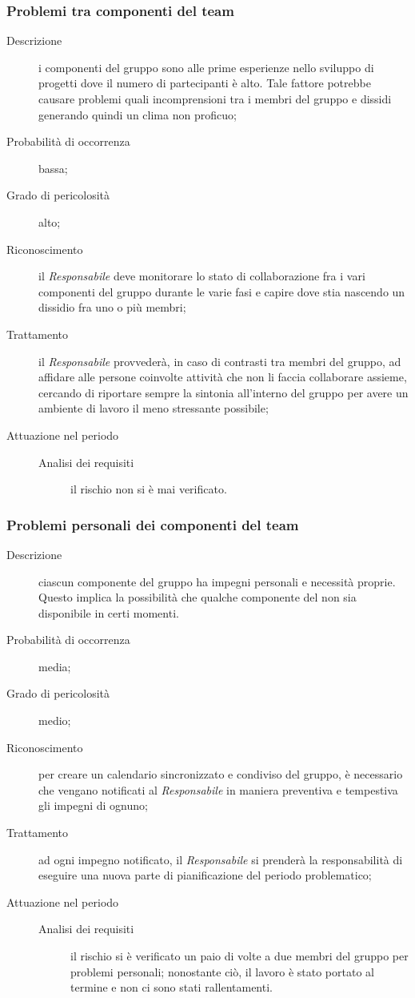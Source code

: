 		\subsubsection{Problemi tra componenti del team}
		\begin{description}
			\item[Descrizione] i componenti del gruppo sono alle prime esperienze nello sviluppo di progetti dove il numero di partecipanti è alto. Tale fattore potrebbe causare problemi quali incomprensioni tra i membri del gruppo e dissidi generando quindi un clima non proficuo;
			\item[Probabilità di occorrenza] bassa;
			\item[Grado di pericolosità] alto;
			\item[Riconoscimento] il \emph{Responsabile} deve monitorare lo stato di collaborazione fra i vari componenti del gruppo durante le varie fasi e capire dove stia nascendo un dissidio fra uno o più membri;
			\item[Trattamento] il \emph{Responsabile} provvederà, in caso di contrasti tra membri del gruppo, ad affidare alle persone coinvolte attività che non li faccia collaborare assieme, cercando di riportare sempre la sintonia all'interno del gruppo per avere un ambiente di lavoro il meno stressante possibile;
			\item[Attuazione nel periodo]
			\begin{description}
				\item[Analisi dei requisiti] il rischio non si è mai verificato.
			\end{description}
		\end{description}
		\subsubsection{Problemi personali dei componenti del team}
		\begin{description}
			\item[Descrizione] ciascun componente del gruppo ha impegni personali e necessità proprie. Questo implica la possibilità che qualche componente del  non sia disponibile in certi momenti.
			\item[Probabilità di occorrenza] media;
			\item[Grado di pericolosità] medio;
			\item[Riconoscimento] per creare un calendario sincronizzato e condiviso del gruppo, è necessario che vengano notificati al \emph{Responsabile} in maniera preventiva e tempestiva gli impegni di ognuno;
			\item[Trattamento] ad ogni impegno notificato, il \emph{Responsabile} si prenderà la responsabilità di eseguire una nuova parte di pianificazione del periodo problematico; 
			\item[Attuazione nel periodo]
			\begin{description}
				\item[Analisi dei requisiti] il rischio si è verificato un paio di volte a due membri del gruppo per problemi personali; nonostante ciò, il lavoro è stato portato al termine e non ci sono stati rallentamenti.
			\end{description}
		\end{description}
